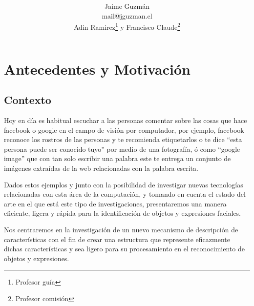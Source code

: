 \documentclass{udparticle}
\title{  }
\author{Jaime Guzmán\\{\small\ttfamily mail@jguzman.cl}\protect\\[5pt]%
{\small Adin Ramirez\thanks{Profesor guía} y Francisco Claude\thanks{Profesor comisión}}%
}
\begin{document}
\maketitle

\section{Antecedentes y Motivación}

\subsection{Contexto}
Hoy en día es habitual escuchar a las personas comentar sobre las cosas que hace facebook o google en el campo de visión por computador, por ejemplo, facebook reconoce los rostros de las personas y te recomienda etiquetarlos o te dice ``esta persona puede ser conocido tuyo'' por medio de una fotografía, ó como ``google image'' que con tan solo escribir una palabra este te entrega un conjunto de imágenes extraídas de la web relacionadas con la palabra escrita.

Dados estos ejemplos y junto con la posibilidad de investigar nuevas tecnologías relacionadas con esta área de la computación, y tomando en cuenta el estado del arte en el que está este tipo de investigaciones, presentaremos una manera eficiente, ligera y rápida para la identificación de objetos y expresiones faciales.

Nos centraremos en la investigación de un nuevo mecanismo de descripción de características con el fin de crear una estructura que represente eficazmente dichas características y sea ligero para su procesamiento en el reconocimiento de objetos y expresiones.
\end{document}
